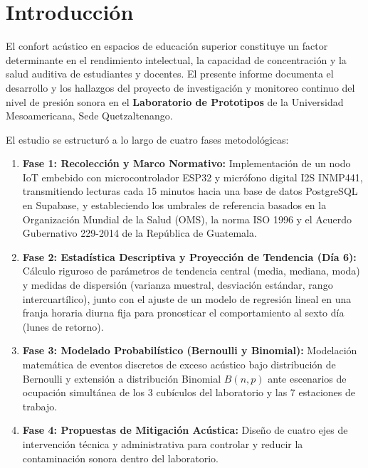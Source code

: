 \documentclass{article}
\begin{document}
\RaggedRight

\newpage
\tableofcontents
\newpage

\cleardoublepage
\pagestyle{plain}

\section{Introducción}
El confort acústico en espacios de educación superior constituye un factor determinante en el rendimiento intelectual, la capacidad de concentración y la salud auditiva de estudiantes y docentes. El presente informe documenta el desarrollo y los hallazgos del proyecto de investigación y monitoreo continuo del nivel de presión sonora en el \textbf{Laboratorio de Prototipos} de la Universidad Mesoamericana, Sede Quetzaltenango.

El estudio se estructuró a lo largo de cuatro fases metodológicas:
\begin{enumerate}
    \item \textbf{Fase 1: Recolección y Marco Normativo:} Implementación de un nodo IoT embebido con microcontrolador ESP32 y micrófono digital I2S INMP441, transmitiendo lecturas cada 15 minutos hacia una base de datos PostgreSQL en Supabase, y estableciendo los umbrales de referencia basados en la Organización Mundial de la Salud (OMS), la norma ISO 1996 y el Acuerdo Gubernativo 229-2014 de la República de Guatemala.
    \item \textbf{Fase 2: Estadística Descriptiva y Proyección de Tendencia (Día 6):} Cálculo riguroso de parámetros de tendencia central (media, mediana, moda) y medidas de dispersión (varianza muestral, desviación estándar, rango intercuartílico), junto con el ajuste de un modelo de regresión lineal en una franja horaria diurna fija para pronosticar el comportamiento al sexto día (lunes de retorno).
    \item \textbf{Fase 3: Modelado Probabilístico (Bernoulli y Binomial):} Modelación matemática de eventos discretos de exceso acústico bajo distribución de Bernoulli y extensión a distribución Binomial $B(n, p)$ ante escenarios de ocupación simultánea de los 3 cubículos del laboratorio y las 7 estaciones de trabajo.
    \item \textbf{Fase 4: Propuestas de Mitigación Acústica:} Diseño de cuatro ejes de intervención técnica y administrativa para controlar y reducir la contaminación sonora dentro del laboratorio.
\end{enumerate}
\end{document}
